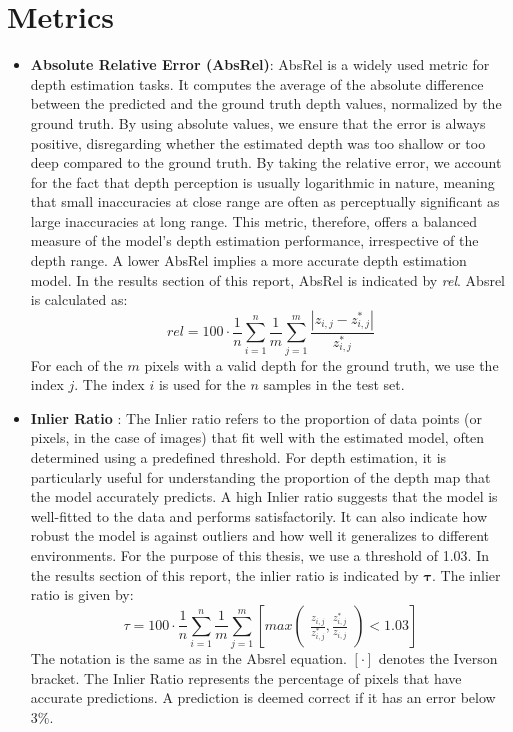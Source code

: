 \section{Metrics}\label{sec:metrics}
\begin{itemize}
    \item \textbf{Absolute Relative Error (AbsRel)}\cite{Eigen2014, Uhrig2017, schroeppel2022benchmark}:  AbsRel is a widely used metric for depth estimation tasks. It computes the average of the absolute difference between the predicted and the ground truth depth values, normalized by the ground truth. By using absolute values, we ensure that the error is always positive, disregarding whether the estimated depth was too shallow or too deep compared to the ground truth. By taking the relative error, we account for the fact that depth perception is usually logarithmic in nature, meaning that small inaccuracies at close range are often as perceptually significant as large inaccuracies at long range. This metric, therefore, offers a balanced measure of the model's depth estimation performance, irrespective of the depth range. A lower AbsRel implies a more accurate depth estimation model. In the results section of this report, AbsRel is indicated by \textit{rel}. Absrel is calculated as:
    \begin{equation}
        rel = 100 \cdot \frac{1}{n} \sum_{i=1}^{n} \frac{1}{m} \sum_{j=1}^{m} \frac{|z_{i,j}-z^*_{i,j}|}{z^*_{i,j}}
    \end{equation}\label{eq:absrel}
    For each of the $m$ pixels with a valid depth for the ground truth, we use the index $j$. The index $i$ is used for the $n$ samples in the test set. 
    \item \textbf{Inlier Ratio} \cite{Eigen2014, Uhrig2017, schroeppel2022benchmark}: The Inlier ratio refers to the proportion of data points (or pixels, in the case of images) that fit well with the estimated model, often determined using a predefined threshold. For depth estimation, it is particularly useful for understanding the proportion of the depth map that the model accurately predicts. A high Inlier ratio suggests that the model is well-fitted to the data and performs satisfactorily. It can also indicate how robust the model is against outliers and how well it generalizes to different environments. For the purpose of this thesis, we use a threshold of 1.03. In the results section of this report, the inlier ratio is indicated by $\mathbf{\tau}$.  The inlier ratio is given by:
    \begin{equation}
         \tau = 100 \cdot \frac{1}{n} \sum_{i=1}^{n} \frac{1}{m} \sum_{j=1}^{m}[max\begin{pmatrix}\frac{z_{i,j}}{z^*_{i,j}}, \frac{z^*_{i,j}}{z_{i,j}}\end{pmatrix}<1.03]
    \end{equation}
    The notation is the same as in the Absrel equation. $[\cdot]$ denotes the Iverson bracket. The Inlier Ratio represents the percentage of pixels that have accurate predictions. A prediction is deemed correct if it has an error below 3\%.
    

\end{itemize}
